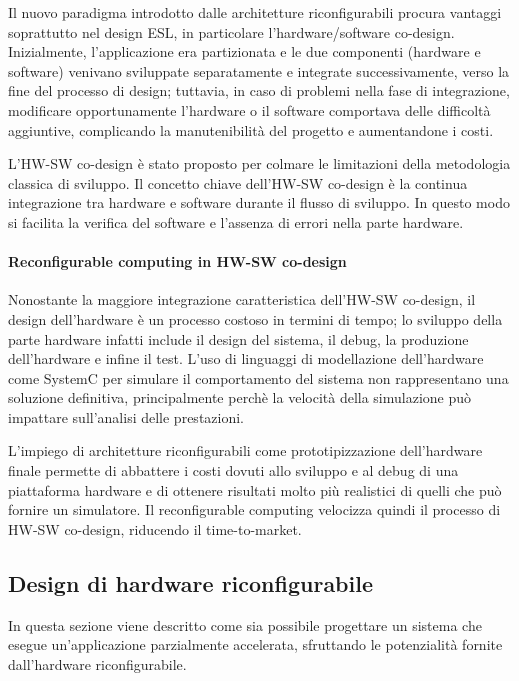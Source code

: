 Il nuovo paradigma introdotto dalle architetture riconfigurabili procura
vantaggi soprattutto nel design \ac{ESL}, in particolare
l'\mbox{hardware/software} co-design. Inizialmente, l'applicazione era
partizionata e le due componenti (hardware e software) venivano sviluppate
separatamente e integrate successivamente, verso la fine del processo di
design; tuttavia, in caso di problemi nella fase di integrazione, modificare
opportunamente l'hardware o il software comportava delle difficoltà aggiuntive,
complicando la manutenibilità del progetto e aumentandone i costi.

L'HW-SW co-design è stato proposto per colmare le limitazioni della metodologia classica di
sviluppo. Il concetto chiave dell'HW-SW co-design è la continua integrazione tra hardware e software
durante il flusso di sviluppo. In questo modo si facilita la verifica del software e l'assenza di
errori nella parte hardware.

\paragraph{Reconfigurable computing in HW-SW co-design}
Nonostante la maggiore integrazione caratteristica dell'HW-SW co-design, il design dell'hardware
è un processo costoso in termini di tempo; lo sviluppo della parte hardware infatti include il
design del sistema, il debug, la produzione dell'hardware e infine il test. L'uso di linguaggi
di modellazione dell'hardware come SystemC \cite{SystemCBook} per simulare il comportamento del
sistema non rappresentano una soluzione definitiva, principalmente perchè la velocità della
simulazione pu\`o impattare sull'analisi delle prestazioni.

L'impiego di architetture riconfigurabili come prototipizzazione dell'hardware finale permette
di abbattere i costi dovuti allo sviluppo e al debug di una piattaforma hardware e di ottenere
risultati molto più realistici di quelli che può fornire un simulatore. Il reconfigurable
computing velocizza quindi il processo di HW-SW co-design, riducendo il time-to-market.

\subsection{Design di hardware riconfigurabile}
In questa sezione viene descritto come sia possibile progettare un sistema che esegue
un'applicazione parzialmente accelerata, sfruttando le potenzialità fornite dall'hardware
riconfigurabile.

